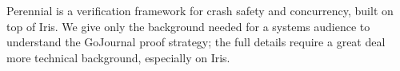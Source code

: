 Perennial is a verification framework for crash safety and concurrency, built on
top of Iris. We give only the background needed for a systems audience to
understand the GoJournal proof strategy; the full details require a great deal
more technical background, especially on Iris.
